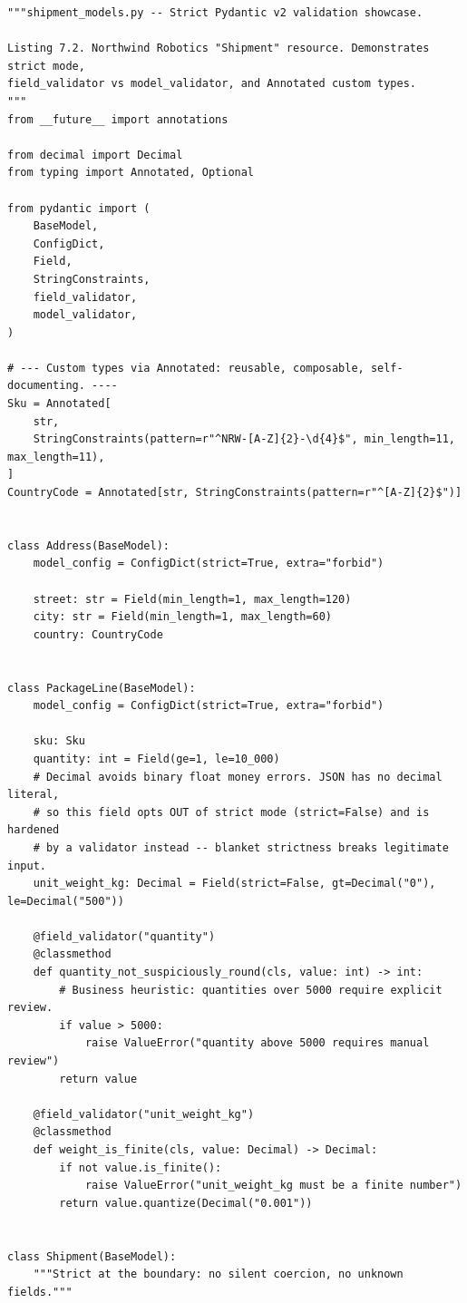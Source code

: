 \begin{verbatim}
"""shipment_models.py -- Strict Pydantic v2 validation showcase.

Listing 7.2. Northwind Robotics "Shipment" resource. Demonstrates strict mode,
field_validator vs model_validator, and Annotated custom types.
"""
from __future__ import annotations

from decimal import Decimal
from typing import Annotated, Optional

from pydantic import (
    BaseModel,
    ConfigDict,
    Field,
    StringConstraints,
    field_validator,
    model_validator,
)

# --- Custom types via Annotated: reusable, composable, self-documenting. ----
Sku = Annotated[
    str,
    StringConstraints(pattern=r"^NRW-[A-Z]{2}-\d{4}$", min_length=11, max_length=11),
]
CountryCode = Annotated[str, StringConstraints(pattern=r"^[A-Z]{2}$")]


class Address(BaseModel):
    model_config = ConfigDict(strict=True, extra="forbid")

    street: str = Field(min_length=1, max_length=120)
    city: str = Field(min_length=1, max_length=60)
    country: CountryCode


class PackageLine(BaseModel):
    model_config = ConfigDict(strict=True, extra="forbid")

    sku: Sku
    quantity: int = Field(ge=1, le=10_000)
    # Decimal avoids binary float money errors. JSON has no decimal literal,
    # so this field opts OUT of strict mode (strict=False) and is hardened
    # by a validator instead -- blanket strictness breaks legitimate input.
    unit_weight_kg: Decimal = Field(strict=False, gt=Decimal("0"), le=Decimal("500"))

    @field_validator("quantity")
    @classmethod
    def quantity_not_suspiciously_round(cls, value: int) -> int:
        # Business heuristic: quantities over 5000 require explicit review.
        if value > 5000:
            raise ValueError("quantity above 5000 requires manual review")
        return value

    @field_validator("unit_weight_kg")
    @classmethod
    def weight_is_finite(cls, value: Decimal) -> Decimal:
        if not value.is_finite():
            raise ValueError("unit_weight_kg must be a finite number")
        return value.quantize(Decimal("0.001"))


class Shipment(BaseModel):
    """Strict at the boundary: no silent coercion, no unknown fields."""


\end{verbatim}
